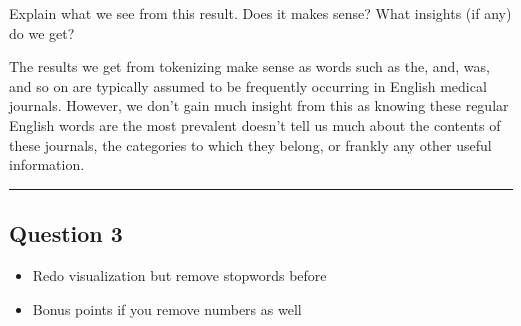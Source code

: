 \documentclass[
]{article}
\newenvironment{Shaded}{\begin{snugshade}}{\end{snugshade}}
\newcommand{\AttributeTok}[1]{\textcolor[rgb]{0.77,0.63,0.00}{#1}}
\newcommand{\DecValTok}[1]{\textcolor[rgb]{0.00,0.00,0.81}{#1}}
\newcommand{\FunctionTok}[1]{\textcolor[rgb]{0.00,0.00,0.00}{#1}}
\newcommand{\NormalTok}[1]{#1}
\newcommand{\OtherTok}[1]{\textcolor[rgb]{0.56,0.35,0.01}{#1}}
\newcommand{\SpecialCharTok}[1]{\textcolor[rgb]{0.00,0.00,0.00}{#1}}
\newcommand{\StringTok}[1]{\textcolor[rgb]{0.31,0.60,0.02}{#1}}
\providecommand{\tightlist}{%
  \setlength{\itemsep}{0pt}\setlength{\parskip}{0pt}}
\begin{document}
Explain what we see from this result. Does it makes sense? What insights
(if any) do we get?

The results we get from tokenizing make sense as words such as the, and,
was, and so on are typically assumed to be frequently occurring in
English medical journals. However, we don't gain much insight from this
as knowing these regular English words are the most prevalent doesn't
tell us much about the contents of these journals, the categories to
which they belong, or frankly any other useful information.

\begin{center}\rule{0.5\linewidth}{0.5pt}\end{center}

\hypertarget{question-3}{%
\subsection{Question 3}\label{question-3}}

\begin{itemize}
\tightlist
\item
  Redo visualization but remove stopwords before
\item
  Bonus points if you remove numbers as well
\end{itemize}

\begin{Shaded}
\end{Shaded}
\end{document}
